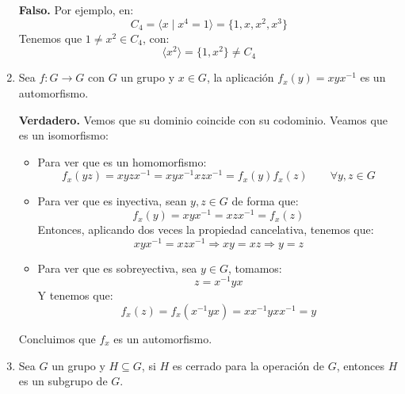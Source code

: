 \documentclass[12pt]{article}
\begin{document}
\begin{ejercicio}
\begin{enumerate}
                \textbf{Falso.} Por ejemplo, en:
                \begin{equation*}
                    C_4 = \langle x \mid x^4 = 1 \rangle = \{1,x,x^2,x^3\}
                \end{equation*}
                Tenemos que $1\neq x^2\in C_4$, con:
                \begin{equation*}
                    \langle x^2 \rangle = \{1,x^2\} \neq C_4
                \end{equation*}
            \item Sea $f:G\to G$ con $G$ un grupo y $x\in G$, la aplicación $f_x(y) = xyx^{-1}$ es un automorfismo.

                \textbf{Verdadero.} Vemos que su dominio coincide con su codominio. Veamos que es un isomorfismo:
                    \begin{itemize}
                        \item Para ver que es un homomorfismo:
                            \begin{equation*}
                                f_x(yz) = xyzx^{-1} = xyx^{-1}xzx^{-1} = f_x(y)f_x(z) \qquad \forall y,z\in G
                            \end{equation*}
                        \item Para ver que es inyectiva, sean $y,z\in G$ de forma que:
                            \begin{equation*}
                                f_x(y) = xyx^{-1} = xzx^{-1} = f_x(z)
                            \end{equation*}
                            Entonces, aplicando dos veces la propiedad cancelativa, tenemos que:
                            \begin{equation*}
                                xyx^{-1} = xzx^{-1} \Longrightarrow xy = xz \Longrightarrow y = z
                            \end{equation*}
                        \item Para ver que es sobreyectiva, sea $y\in G$, tomamos:
                            \begin{equation*}
                                z = x^{-1}yx
                            \end{equation*}
                            Y tenemos que:
                            \begin{equation*}
                                f_x(z) = f_x(x^{-1}yx) = xx^{-1}yxx^{-1} = y
                            \end{equation*}
                    \end{itemize}
                    Concluimos que $f_x$ es un automorfismo.
            \item Sea $G$ un grupo y $H\subseteq G$, si $H$ es cerrado para la operación de $G$, entonces $H$ es un subgrupo de $G$.


\end{enumerate}
\end{ejercicio}
\end{document}
